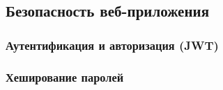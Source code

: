 \subsection{Безопасность веб-приложения}

\subsubsection{Аутентификация и авторизация (JWT)}

\subsubsection{Хеширование паролей}
